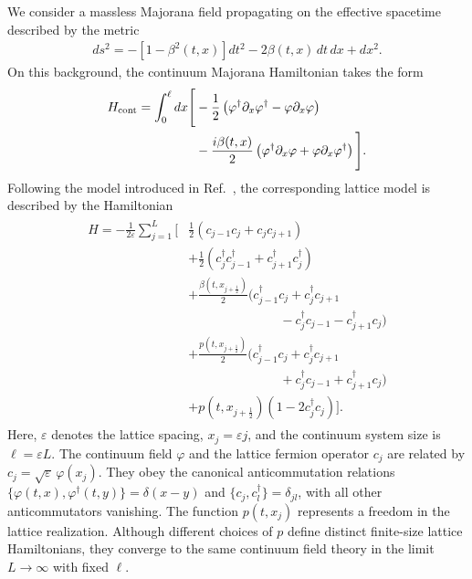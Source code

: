 \documentclass[reprint,amsmath,amssymb,aps,prb]{revtex4-2}
\begin{document}
We consider a massless Majorana field propagating on the effective spacetime described by the metric
\begin{align}
    ds^{2} =
    -\left[1-\beta^{2}(t,x)\right]dt^{2}
    - 2\beta(t,x)\,dt\,dx
    + dx^{2}.
    \label{simplified_metric}
\end{align}
On this background, the continuum Majorana Hamiltonian takes the form
\begin{align}
\begin{split}
H_{\rm cont}
= \int_{0}^{\ell} dx \Bigg[
&-\frac{1}{2}
\left(
\varphi^\dagger \partial_x \varphi^\dagger
-
\varphi \partial_x \varphi
\right) \\
&-\frac{i\beta(t,x)}{2}
\left(
\varphi^\dagger \partial_x \varphi
+
\varphi \partial_x \varphi^\dagger
\right)
\Bigg].
\end{split}
\label{continuum_hamiltonian_simplified}
\end{align}
Following the model introduced in Ref.~\cite{PhysRevResearch.7.023197}, the corresponding lattice model is described by the Hamiltonian
\begin{align}
\begin{split}
H
= - \frac{1}{2\varepsilon} \sum_{j=1}^{L} \Bigg[
& \frac12
\left(
c_{j-1}c_{j}
+
c_{j}c_{j+1}
\right)
\\
&+
\frac12
\left(
c_{j}^{\dagger}c_{j-1}^{\dagger}
+
c_{j+1}^{\dagger}c_{j}^{\dagger}
\right)
\\
&+
\frac{\beta(t,x_{j+\frac12})}{2}
\Big(
c_{j-1}^{\dagger}c_{j}
+
c_{j}^{\dagger}c_{j+1}
\\
&\hspace{3cm}
-
c_{j}^{\dagger}c_{j-1}
-
c_{j+1}^{\dagger}c_{j}
\Big)
\\
&+
\frac{p(t,x_{j+\frac{1}{2}})}{2}
\Big(
c_{j-1}^{\dagger}c_{j}
+
c_{j}^{\dagger}c_{j+1}
\\
&\hspace{3cm}
+
c_{j}^{\dagger}c_{j-1}
+
c_{j+1}^{\dagger}c_{j}
\Big)
\\
&+
p(t,x_{j+\frac{1}{2}})
\left(
1-2c_{j}^{\dagger}c_{j}
\right)
\Bigg].
\end{split}
\label{symmetrized_lattice_hamiltonian}
\end{align}
Here, $\varepsilon$ denotes the lattice spacing, $x_j=\varepsilon j$, and the continuum system size is $\ell=\varepsilon L$.
The continuum field $\varphi$ and the lattice fermion operator $c_j$ are related by $c_j=\sqrt{\varepsilon}\,\varphi(x_j)$.
They obey the canonical anticommutation relations
$\{\varphi(t,x),\varphi^{\dagger}(t,y)\}=\delta(x-y)$ and
$\{c_j,c_l^{\dagger}\}=\delta_{jl}$, with all other anticommutators vanishing.
The function $p(t,x_j)$ represents a freedom in the lattice realization.
Although different choices of $p$ define distinct finite-size lattice Hamiltonians, they converge to the same continuum field theory in the limit $L\to\infty$ with fixed $\ell$.
\end{document}
